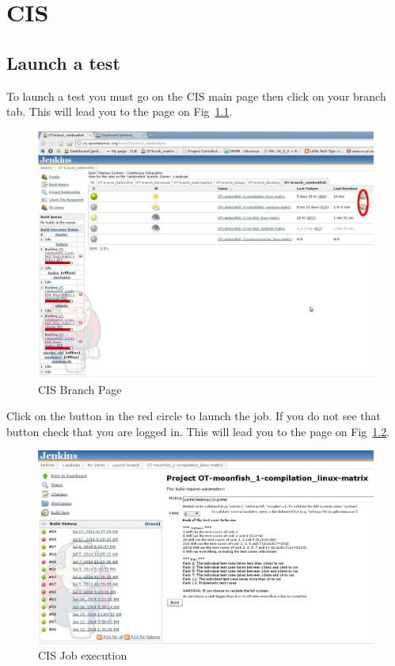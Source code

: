 %
\chapter{CIS}
%
%
\section{Launch a test}
%
%
To launch a test you must go on the CIS main page then click on your branch tab.
This will lead you to the page on Fig~\ref{fig:cis-main}.
%
\begin{figure}[H]
    \centering
    \includegraphics[scale=0.35]{graphics/cis-main.jpg}
    \caption{CIS Branch Page}
    \label{fig:cis-main}
\end{figure}
%
Click on the button in the red circle to launch the job. If you do not see that
button check that you are logged in. This will lead you to the page on Fig~\ref{fig:cis-run-job}.
%
\begin{figure}[H]
    \centering
    \includegraphics[scale=0.35]{graphics/cis-run-job.jpg}
    \caption{CIS Job execution}
    \label{fig:cis-run-job}
\end{figure}
